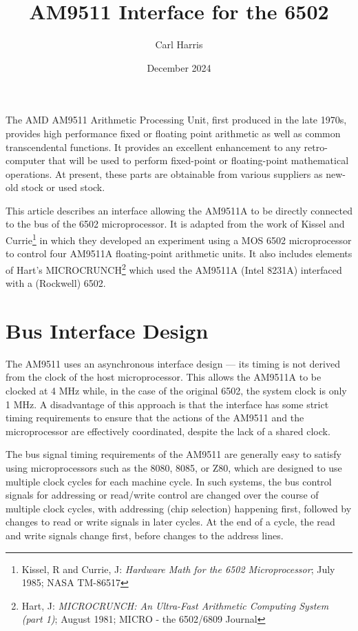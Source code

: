 \documentclass[11pt, letterpaper]{article}
\title{AM9511 Interface for the 6502}
\author{Carl Harris}
\date{December 2024}
\begin{document}
\maketitle
\noindent 
The AMD AM9511 Arithmetic Processing Unit, first produced in the late 1970s, 
provides high performance fixed or floating point arithmetic as well as
common transcendental functions. It provides an excellent enhancement to any 
retro-computer that will be used to perform fixed-point or floating-point 
mathematical operations. At present, these parts are obtainable from various 
suppliers as new-old stock or used stock.

This article describes an interface allowing the AM9511A to be directly 
connected to the bus of the 6502 microprocessor. It is adapted from the work 
of Kissel and Currie\footnote{Kissel, R and Currie, J: 
\emph{Hardware Math for the 6502 Microprocessor}; July 1985; 
NASA TM-86517} in which they developed an experiment using a MOS 6502 
microprocessor to control four AM9511A floating-point arithmetic units. It
also includes elements of Hart’s MICROCRUNCH\footnote{Hart, J: 
\emph{MICROCRUNCH: An Ultra-Fast Arithmetic Computing System (part 1)}; 
August 1981; MICRO - the 6502/6809 Journal} which used the AM9511A 
(Intel 8231A) interfaced with a (Rockwell) 6502.

\section{Bus Interface Design}
The AM9511 uses an asynchronous interface design --- its timing is not derived 
from the clock of the host microprocessor. This allows the AM9511A to be 
clocked at 4 MHz while, in the case of the original 6502, the system clock 
is only 1 MHz. A disadvantage of this approach is that the interface has 
some strict timing requirements to ensure that the actions of the AM9511 
and the microprocessor are effectively coordinated, despite the lack of a 
shared clock.

The bus signal timing requirements of the AM9511 are generally easy to 
satisfy using microprocessors such as the 8080, 8085, or Z80, which
are designed to use multiple clock cycles for each machine cycle. In such 
systems, the bus control signals for addressing or read/write control are 
changed over the course of multiple clock cycles, with addressing (chip 
selection) happening first, followed by changes to read or write signals 
in later cycles. At the end of a cycle, the read and write signals change
first, before changes to the address lines.
\end{document}
